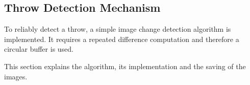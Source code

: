 \subsection{Throw Detection Mechanism}
\label{subsec:throw_detection_mechanism}

To reliably detect a throw, a simple image change detection algorithm is implemented.
It requires a repeated difference computation and therefore a circular buffer is used.

This section explains the algorithm, its implementation and the saving of the images.






